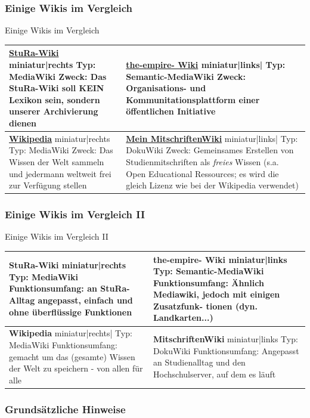 \documentclass{beamer}
\begin{document}
\begin{frame}
  \frametitle{Einige Wikis im Vergleich}{Einige Wikis im Vergleich}
  \begin{longtable}{|l|l|}
    \hline
    \textbf{\href{http://wiki.stura.htw-dresden.de}{StuRa-Wiki}} miniatur|rechts Typ: MediaWiki Zweck: Das StuRa-Wiki soll KEIN Lexikon sein, sondern unserer Archivierung dienen & \textbf{\href{http://www.the-empire.de}{the-empire- Wiki}} miniatur|links| Typ: Semantic-MediaWiki Zweck: Organisations- und Kommunitationsplattform einer öffentlichen Initiative \\ 
    \hline
     
    \textbf{\href{http://www.wikipedia.de}{Wikipedia}} miniatur|rechts Typ: MediaWiki Zweck: Das Wissen der Welt sammeln und jedermann weltweit frei zur Verfügung stellen & \textbf{\href{http://www2.htw-dresden.de/~s70341/cgi-bin/dokuwiki/doku.php}{Mein MitschriftenWiki}} miniatur|links| Typ: DokuWiki Zweck: Gemeinsames Erstellen von Studienmitschriften als \emph{freies} Wissen (s.a.  Open Educational Ressources; es wird die gleich Lizenz wie bei der Wikipedia verwendet) \\ 
    \hline
     
  \end{longtable}
\end{frame}


\begin{frame}
  \frametitle{Einige Wikis im Vergleich II}{Einige Wikis im Vergleich II}
  \begin{longtable}{|l|l|}
    \hline
    \textbf{StuRa-Wiki} miniatur|rechts Typ: MediaWiki Funktionsumfang: an StuRa- Alltag angepasst, einfach und ohne überflüssige Funktionen & \textbf{the-empire- Wiki} miniatur|links Typ: Semantic-MediaWiki Funktionsumfang: Ähnlich Mediawiki, jedoch mit einigen Zusatzfunk- tionen (dyn. Landkarten...) \\ 
    \hline
     
    \textbf{Wikipedia} miniatur|rechts| Typ: MediaWiki Funktionsumfang: gemacht um das (gesamte) Wissen der Welt zu speichern - von allen für alle & \textbf{MitschriftenWiki} miniatur|links Typ: DokuWiki Funktionsumfang: Angepasst an Studienalltag und den Hochschulserver, auf dem es läuft \\ 
    \hline
     
  \end{longtable}
\end{frame}


\begin{frame}
  \frametitle{Grundsätzliche Hinweise}
\end{frame}
\end{document}

